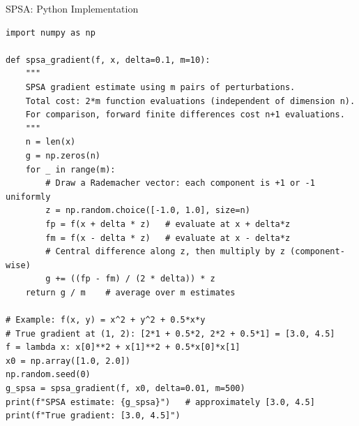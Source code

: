 \documentclass[aspectratio=169,10pt]{beamer}
\begin{document}
\begin{frame}[fragile]{SPSA: Python Implementation}
\begin{lstlisting}[caption={SPSA gradient estimation --- Python (NumPy)}]
import numpy as np

def spsa_gradient(f, x, delta=0.1, m=10):
    """
    SPSA gradient estimate using m pairs of perturbations.
    Total cost: 2*m function evaluations (independent of dimension n).
    For comparison, forward finite differences cost n+1 evaluations.
    """
    n = len(x)
    g = np.zeros(n)
    for _ in range(m):
        # Draw a Rademacher vector: each component is +1 or -1 uniformly
        z = np.random.choice([-1.0, 1.0], size=n)
        fp = f(x + delta * z)   # evaluate at x + delta*z
        fm = f(x - delta * z)   # evaluate at x - delta*z
        # Central difference along z, then multiply by z (component-wise)
        g += ((fp - fm) / (2 * delta)) * z
    return g / m    # average over m estimates

# Example: f(x, y) = x^2 + y^2 + 0.5*x*y
# True gradient at (1, 2): [2*1 + 0.5*2, 2*2 + 0.5*1] = [3.0, 4.5]
f = lambda x: x[0]**2 + x[1]**2 + 0.5*x[0]*x[1]
x0 = np.array([1.0, 2.0])
np.random.seed(0)
g_spsa = spsa_gradient(f, x0, delta=0.01, m=500)
print(f"SPSA estimate: {g_spsa}")   # approximately [3.0, 4.5]
print(f"True gradient: [3.0, 4.5]")
\end{lstlisting}
\end{frame}
\end{document}
